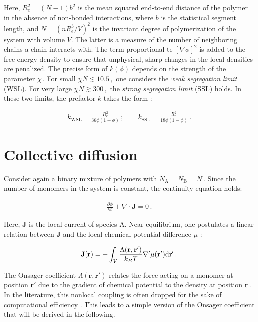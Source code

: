 \documentclass[bachelor,       %
               twoside,        %
               BCOR10mm,       %
                ngerman,english  %
               ]{GAUBM}
\begin{document}
Here, $R_e^2=(N-1)b^2$ is the mean squared end-to-end distance of the polymer in the absence of non-bonded interactions, where $b$ is the statistical segment length, and $\bar N=\left(nR_e^3/V\right)^2$ is the invariant degree of polymerization of the system with volume $V$. The latter is a measure of the number of neighboring chains a chain interacts with. The term proportional to $[\nabla\phi]^2$ is added to the free energy density to ensure that unphysical, sharp changes in the local densities are penalized. The precise form of $k(\phi)$ depends on the strength of the parameter $\chi\,$. For small $\chi N\lesssim 10.5\,,$ one considers the \textit{weak segregation limit} (WSL). For very large $\chi N\gtrsim300\,,$ the \textit{strong segregation limit} (SSL) holds. In these two limits, the prefactor $k$ takes the form \cite{Reister02}:

\begin{align}
  k_\mathrm{WSL}=\frac{R_e^2}{36\phi(1-\phi)}\,;\qquad k_\mathrm{SSL}=\frac{R_e^2}{18\phi(1-\phi)}\,.
\end{align}


\section{Collective diffusion}

Consider again a binary mixture of polymers with $N_\mathrm A=N_\mathrm B=N\,$. Since the number of monomers in the system is constant, the continuity equation holds:

\begin{align}
  \frac{\partial\phi}{\partial t}+\nabla\cdot\mathbf{J}=0\,.
  \label{eq:conti}
\end{align}

Here, $\mathbf{J}$ is the local current of species A. Near equilibrium, one postulates a linear relation between $\mathbf J$ and the local chemical potential difference $\mu$ \cite{deGennes80}:


\begin{align}
    \mathbf J(\mathbf{r})=-\int_V\frac{\Lambda(\mathbf{r}, \mathbf{r'})}{k_BT}\nabla '\mu(\mathbf{r'})\text d \mathbf{r'}\,.
    \label{eq:current}
\end{align}

The Onsager coefficient $\Lambda(\mathbf{r}, \mathbf{r'})$ relates the force acting on a monomer at position $\mathbf{r'}$ due to the gradient of chemical potential to the density at position $\mathbf{r}\,$. In the literature, this nonlocal coupling is often dropped for the sake of computational efficiency \cite{Fraaje97,deGennes80,Binder83}. This leads to a simple version of the Onsager coefficient that will be derived in the following. 
\end{document}
